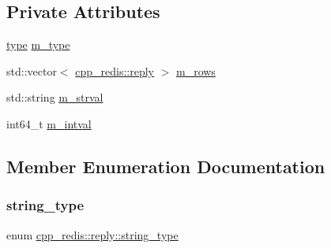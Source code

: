 \subsection*{Private Attributes}
\begin{DoxyCompactItemize}
\item 
\hyperlink{classcpp__redis_1_1reply_acc272b2a52164cac1d110c619a0b25bd}{type} \hyperlink{classcpp__redis_1_1reply_a4520fe03b53b783a0f5f74a2d5339815}{m\+\_\+type}
\item 
std\+::vector$<$ \hyperlink{classcpp__redis_1_1reply}{cpp\+\_\+redis\+::reply} $>$ \hyperlink{classcpp__redis_1_1reply_a74ab4d261036adc073d11c275bff3420}{m\+\_\+rows}
\item 
std\+::string \hyperlink{classcpp__redis_1_1reply_af85cae43238db4a78580ff83f00e7c1c}{m\+\_\+strval}
\item 
int64\+\_\+t \hyperlink{classcpp__redis_1_1reply_a70d0c595988cb280538b4cc67a72d9ee}{m\+\_\+intval}
\end{DoxyCompactItemize}


\subsection{Member Enumeration Documentation}
\mbox{\label{classcpp__redis_1_1reply_ac192ba4cb8f2bb6e7cb465edf755328b}} 
\subsubsection{\texorpdfstring{string\+\_\+type}{string\_type}}
{\footnotesize\ttfamily enum \hyperlink{classcpp__redis_1_1reply_ac192ba4cb8f2bb6e7cb465edf755328b}{cpp\+\_\+redis\+::reply\+::string\+\_\+type}\hspace{0.3cm}{\ttfamily [strong]}}

